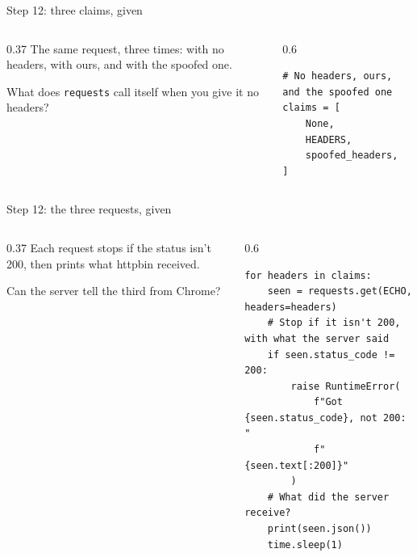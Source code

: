 \documentclass[9pt,aspectratio=169]{beamer}
\begin{document}
\begin{frame}[fragile]{Step 12: three claims, given}
    \begin{columns}[T]
        \begin{column}{0.37\textwidth}
            The same request, three times: with no headers, with ours, and with the spoofed one.

            \medskip
            What does \texttt{requests} call itself when you give it no headers?
        \end{column}
        \begin{column}{0.6\textwidth}
\begin{lstlisting}[style=lab]
# No headers, ours, and the spoofed one
claims = [
    None,
    HEADERS,
    spoofed_headers,
]
\end{lstlisting}
        \end{column}
    \end{columns}
\end{frame}

\begin{frame}[fragile]{Step 12: the three requests, given}
    \begin{columns}[T]
        \begin{column}{0.37\textwidth}
            Each request stops if the status isn't 200, then prints what httpbin received.

            \medskip
            Can the server tell the third from Chrome?
        \end{column}
        \begin{column}{0.6\textwidth}
\begin{lstlisting}[style=lab]
for headers in claims:
    seen = requests.get(ECHO, headers=headers)
    # Stop if it isn't 200, with what the server said
    if seen.status_code != 200:
        raise RuntimeError(
            f"Got {seen.status_code}, not 200: "
            f"{seen.text[:200]}"
        )
    # What did the server receive?
    print(seen.json())
    time.sleep(1)
\end{lstlisting}
        \end{column}
    \end{columns}
\end{frame}
\end{document}
